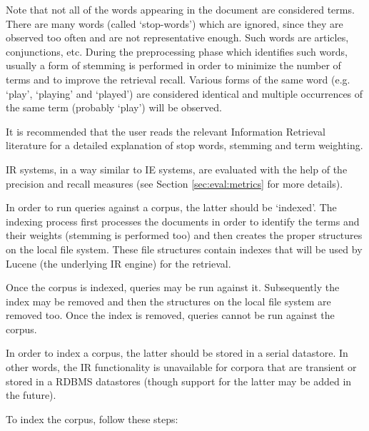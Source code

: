 Note that not all of the words appearing in the document are
considered terms. There are many words (called `stop-words') which are
ignored, since they are observed too often and are not representative
enough. Such words are articles, conjunctions, etc. During the
preprocessing phase which identifies such words, usually a form of
stemming is performed in order to minimize the number of terms and to
improve the retrieval recall. Various forms of the same word
(e.g. `play', `playing' and `played') are considered identical and
multiple occurrences of the same term (probably `play') will be
observed.

It is recommended that the user reads the relevant Information
Retrieval literature for a detailed explanation of stop words,
stemming and term weighting.

IR systems, in a way similar to IE systems, are evaluated with the
help of the precision and recall measures (see Section
\ref{sec:eval:metrics} for more details).



In order to run queries against a corpus, the latter should be
`indexed'. The indexing process first processes the documents in order
to identify the terms and their weights (stemming is performed too)
and then creates the proper structures on the local file system. These
file structures contain indexes that will be used by Lucene (the
underlying IR engine) for the retrieval.

Once the corpus is indexed, queries may be run against
it. Subsequently the index may be removed and then the structures on
the local file system are removed too. Once the index is removed,
queries cannot be run against the corpus.


In order to index a corpus, the latter should be stored in a serial
datastore. In other words, the IR functionality is unavailable for
corpora that are transient or stored in a RDBMS datastores (though
support for the latter may be added in the future).

To index the corpus, follow these steps:

